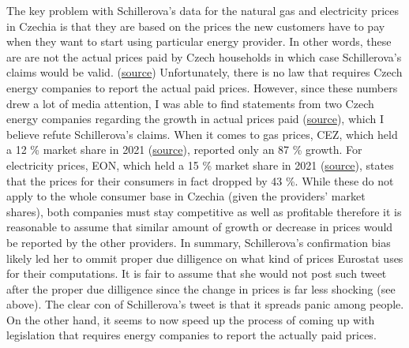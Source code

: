 \documentclass[fleqn,12pt]{article}
\begin{document}
The key problem with Schillerova's data for the natural gas and electricity prices in Czechia is that they are based on the prices the new customers have to pay when they 
want to start using particular energy provider. In other words, these are are not the actual prices paid by Czech households in which case Schillerova's claims would be valid. 
(\href{https://www.idnes.cz/ekonomika/domaci/cena-plyn-cesko-lonsky-rust-eurostat.A230426_124224_ekonomika_vebe}{source}) Unfortunately, there is no law that requires 
Czech energy companies to report the actual paid prices. However, since these numbers drew a lot of media attention, I was able to find statements from two Czech energy companies regarding the 
growth in actual prices paid (\href{https://www.idnes.cz/ekonomika/domaci/cena-plyn-cesko-lonsky-rust-eurostat.A230426_124224_ekonomika_vebe}{source}), which I believe refute Schillerova's claims. 
When it comes to gas prices, CEZ, which held a 12 \% market share in 2021 (\href{https://ekonomickydenik.cz/cez-a-innogy-posiluji-podil-na-proridlem-trhu-s-elektrinou-a-plynem/}{source}), reported only an 87 \% growth.
For electricity prices, EON, which held a 15 \% market share in 2021 (\href{https://ekonomickydenik.cz/cez-a-innogy-posiluji-podil-na-proridlem-trhu-s-elektrinou-a-plynem/}{source}), 
states that the prices for their consumers in fact dropped by 43 \%. While these do not apply to the whole 
consumer base in Czechia (given the providers' market shares), both companies must stay competitive as well as profitable therefore it is reasonable to assume that similar 
amount of growth or decrease in prices would be reported by the other providers. In summary, Schillerova's confirmation bias likely led her to ommit proper due dilligence on what 
kind of prices Eurostat uses for their computations. It is fair to assume that she would not post such tweet after the proper due dilligence since the change in prices is 
far less shocking (see above). The clear con of Schillerova's tweet is that it spreads panic among people. On the other hand, it seems to now speed up the process of coming up with 
legislation that requires energy companies to report the actually paid prices.
\newpage

\end{document}
